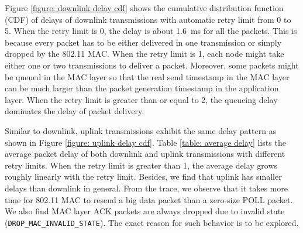 \documentclass{article}
\begin{document}
Figure \ref{figure: downlink delay cdf} shows the cumulative distribution function (CDF) of delays of downlink transmissions with automatic retry limit from 0 to 5. When the retry limit is 0, the delay is about \SI{1.6}{ms} for all the packets. This is because every packet has to be either delivered in one transmission or simply dropped by the 802.11 MAC. When the retry limit is 1, each node might take either one or two transmissions to deliver a packet. Moreover, some packets might be queued in the MAC layer so that the real send timestamp in the MAC layer can be much larger than the packet generation timestamp in the application layer. When the retry limit is greater than or equal to 2, the queueing delay dominates the delay of packet delivery. 

Similar to downlink, uplink transmissions exhibit the same delay pattern as shown in Figure \ref{figure: uplink delay cdf}. Table \ref{table: average delay} lists the average packet delay of both downlink and uplink transmissions with different retry limits. When the retry limit is greater than 1, the average delay grows roughly linearly with the retry limit. Besides, we find that uplink has smaller delays than downlink in general. From the trace, we observe that it takes more time for 802.11 MAC to resend a big data packet than a zero-size POLL packet. We also find MAC layer ACK packets are always dropped due to invalid state (\lstinline|DROP_MAC_INVALID_STATE|). The exact reason for such behavior is to be explored.
\end{document}
